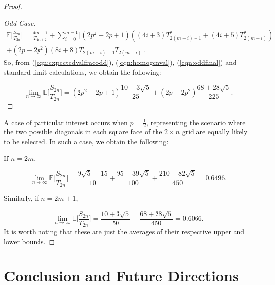 \documentclass{amsart}
\theoremstyle{definition}
\newcommand{\yandi}[1]{\marginpar{\tiny \color{red} Yandi: #1}}
\begin{document}
\begin{proof}
\begin{proof}[Odd Case]
\begin{equation}\label{eqn:expectedvalfracodd}
    \begin{split}
\mathbb{E}\bigg[\frac{S_{2n}}{T_{2n}}\bigg] = \frac{4m + 1}{T_{4m + 2} }+\sum_{i=0}^{m-1}[(2p^2 - 2p + 1)((4i+3)T_{2(m-i)+1}^2+(4i+5)T_{2(m-i)}^2) \\
+(2p - 2p^2)(8i+8)T_{2(m-i)+1}T_{2(m-i)}].
\end{split}
\end{equation}
So, from (\ref{eqn:expectedvalfracodd}), (\ref{eqn:homogenval}),  (\ref{eqn:oddfinal}) and standard limit calculations, we obtain the following: 

\[\lim_{n \to \infty}\mathbb{E}\bigg[\frac{S_{2n}}{T_{2n}}\bigg] = (2p^2 - 2p + 1)\frac{10 + 3\sqrt{5}}{25} + (2p - 2p^2)\frac{68 + 28\sqrt{5}}{225}.\]

\end{proof}

A case of particular interest occurs when $p = \frac{1}{2}$, representing the scenario where the two possible diagonals in each square face of the $2 \times n$ grid are equally likely to be selected. In such a case, we obtain the following: 
\par
If $n = 2m$, 

\begin{equation}\label{eqn:finalevenratio}
    \lim_{n \to \infty}\mathbb{E}\bigg[\frac{S_{2n}}{T_{2n}}\bigg] = \frac{9\sqrt{5} - 15}{10} + \frac{95 - 39\sqrt{5}}{100} + \frac{210 - 82\sqrt{5}}{450} = 0.6496.
\end{equation}

Similarly, if $n = 2m + 1$, 

\begin{equation}\label{eqn:finaloddratio}
    \lim_{n \to \infty}\mathbb{E}\bigg[\frac{S_{2n}}{T_{2n}}\bigg] = \frac{10 + 3\sqrt{5}}{50} + \frac{68 + 28\sqrt{5}}{450} = 0.6066.
\end{equation}
It is worth noting that these are just the averages of their respective upper and lower bounds.
\end{proof}


\section{Conclusion and Future Directions}

\end{document}
